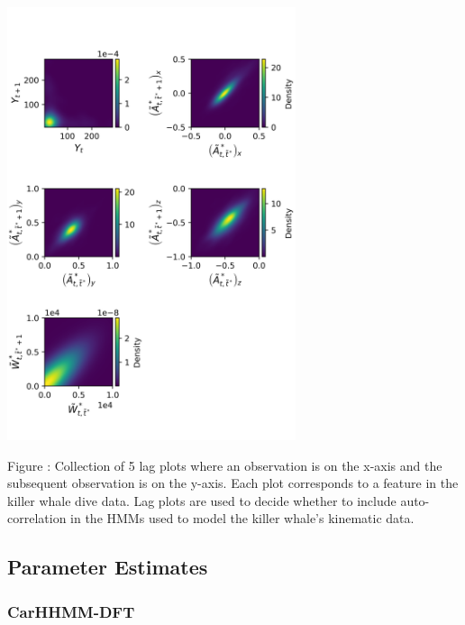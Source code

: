 \documentclass{article}
\begin{document}
        \begin{center}
        \includegraphics[height=5in]{../Plots/CarHHMM2_lagplot.png}
        \end{center}
        
        \noindent Figure : Collection of 5 lag plots where an observation is on the x-axis and the subsequent observation is on the y-axis. Each plot corresponds to a feature in the killer whale dive data. Lag plots are used to decide whether to include auto-correlation in the HMMs used to model the killer whale's kinematic data.
        \addtocounter{fignum}{1}
        
        \newpage
    
    \subsection{Parameter Estimates}

        \subsubsection{CarHHMM-DFT}
        
\end{document}
